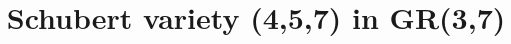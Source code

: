 





\title{Schubert variety (4,5,7) in GR(3,7)}
\author{}


\notations
\indicatormatrix
\hilbert
\computehbfti

